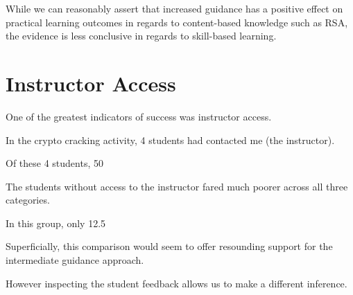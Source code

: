 While we can reasonably assert that increased guidance has a positive effect on practical learning outcomes in regards to content-based knowledge such as RSA, the evidence is less conclusive in regards to skill-based learning. 















        







    \section{Instructor Access}







        One of the greatest indicators of success was instructor access. %







In the crypto cracking activity, 4 students had contacted me (the instructor). %







Of these 4 students, 50\







        The students without access to the instructor fared much poorer across all three categories. %







In this group, only 12.5\







        Superficially, this comparison would seem to offer resounding support for the intermediate guidance approach. %







However inspecting the student feedback allows us to make a different inference. %







